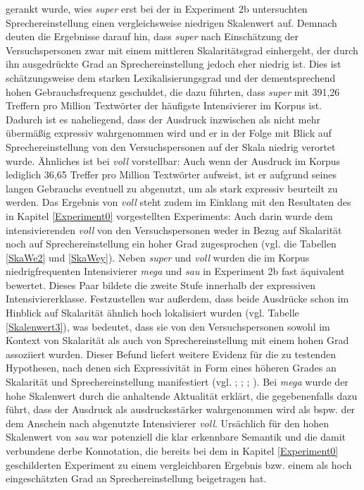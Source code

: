 gerankt wurde, wies \textit{super} erst bei der in {Experiment 2b} untersuchten Sprechereinstellung einen vergleichsweise niedrigen Skalenwert auf. Demnach deuten die Ergebnisse darauf hin, dass \textit{super} nach Einschätzung der Versuchspersonen zwar mit einem mittleren Skalaritätsgrad einhergeht, der durch ihn ausgedrückte Grad an Sprechereinstellung jedoch eher niedrig ist. Dies ist schätzungsweise dem starken Lexikalisierungsgrad und der dementsprechend hohen Gebrauchsfrequenz geschuldet, die dazu führten, dass \textit{super} mit 391,26 Treffern pro Million Textwörter der häufigste Intensivierer im Korpus ist. Dadurch ist es naheliegend, dass der Ausdruck inzwischen als nicht mehr übermäßig expressiv wahrgenommen wird und er in der Folge mit Blick auf Sprechereinstellung von den Versuchspersonen auf der Skala niedrig verortet wurde. Ähnliches ist bei \textit{voll} vorstellbar: Auch wenn der Ausdruck im Korpus lediglich 36,65 Treffer pro Million Textwörter aufweist, ist er aufgrund seines langen Gebrauchs eventuell zu abgenutzt, um als stark expressiv beurteilt zu werden. Das Ergebnis von \textit{voll} steht zudem im Einklang mit den Resultaten des in {Kapitel \ref{Experiment0}} vorgestellten Experiments: Auch darin wurde dem intensivierenden \textit{voll} von den Versuchspersonen weder in Bezug auf Skalarität noch auf Sprechereinstellung ein hoher Grad zugesprochen (vgl. die {Tabellen \ref{SkaWe2} und \ref{SkaWey}}). Neben \textit{super} und \textit{voll} wurden die im Korpus niedrigfrequenten Intensivierer \textit{mega} und \textit{sau} in {Experiment 2b} fast äquivalent bewertet. Dieses Paar bildete die zweite Stufe innerhalb der expressiven Intensiviererklasse. Festzustellen war außerdem, dass beide Ausdrücke schon im Hinblick auf Skalarität ähnlich hoch lokalisiert wurden (vgl. {Tabelle \ref{Skalenwert3}}), was bedeutet, dass sie von den Versuchspersonen sowohl im Kontext von Skalarität als auch von Sprechereinstellung mit einem hohen Grad assoziiert wurden. Dieser Befund liefert weitere Evidenz für die zu testenden Hypothesen, nach denen sich Expressivität in Form eines höheren Grades an Skalarität und Sprechereinstellung manifestiert (vgl. {\citealt[315]{Lang.1983}}; {\citealt[22]{Paradis.1997}}; {\citealt[57]{Ortner.2014}}; \citealt[133]{Gutzmann.2019a}). Bei \textit{mega} wurde der hohe Skalenwert durch die anhaltende Aktualität erklärt, die gegebenenfalls dazu führt, dass der Ausdruck als ausdrucksstärker wahrgenommen wird als bspw. der dem Anschein nach abgenutzte Intensivierer \textit{voll}. Ursächlich für den hohen Skalenwert von \textit{sau} war potenziell die klar erkennbare Semantik und die damit verbundene derbe Konnotation, die bereits bei dem in Kapitel \ref{Experiment0} geschilderten Experiment zu einem vergleichbaren Ergebnis bzw. einem als hoch eingeschätzten Grad an Sprechereinstellung beigetragen hat.





